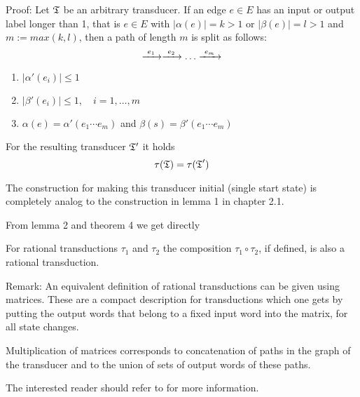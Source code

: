 Proof: Let $\mbox{$\mathfrak{T}$}$ be an arbitrary transducer. If an edge $e \in E$ has an
input or output label longer than 1, that is $e \in E$ with $|\alpha(e)| = k >
1$ or $|\beta(e)| = l > 1$ and $m := max(k, l)$, then a path of length $m$ is
split as follows:
\[ \xrightarrow{\ {e_1}\ } \xrightarrow{\ {e_2}\ } \ldots \xrightarrow{\ {e_m}\ } \]

\begin{enumerate}
  \item $|\alpha'(e_i)| \leq 1$
  \item $|\beta'(e_i)| \leq 1,\quad i = 1,\ldots,m$
  \item $\alpha(e) = \alpha'(e_1 \cdots e_m)$ and $\beta(s) = \beta'(e_1
  \cdots e_m)$
\end{enumerate}

For the resulting transducer $\mbox{$\mathfrak{T'}$}$ it holds \[ \tau(\mbox{$\mathfrak{T}$}) = \tau(\mbox{$\mathfrak{T}$}')
\]

The construction for making this transducer initial (single start state) is
completely analog to the construction in lemma 1 in chapter 2.1.

From lemma 2 and theorem 4 we get directly

\begin{theorem} For rational transductions $\tau_1$ and $\tau_2$ the composition $\tau_1 \circ
\tau_2$, if defined, is also a rational transduction.
\end{theorem}

Remark: An equivalent definition of rational transductions can be given using
matrices. These are a compact description for transductions which one gets by
putting the output words that belong to a fixed input word into the matrix, for
all state changes.

Multiplication of matrices corresponds to concatenation of paths in the graph of
the transducer and to the union of sets of output words of these paths.

The interested reader should refer to \cite{Berstel79} for more information.

















